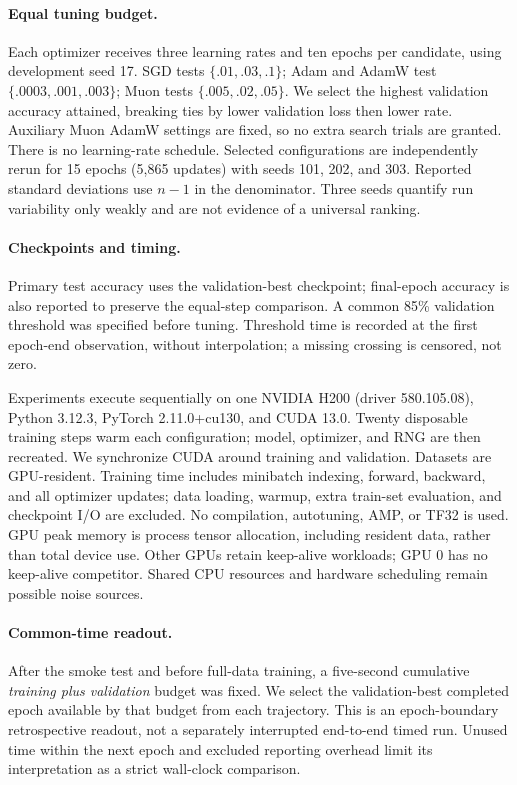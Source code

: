 \documentclass[10pt,a4paper,twocolumn]{article}
\begin{document}
\paragraph{Equal tuning budget.}
Each optimizer receives three learning rates and ten epochs per candidate, using development seed 17. SGD tests $\{.01,.03,.1\}$; Adam and AdamW test $\{.0003,.001,.003\}$; Muon tests $\{.005,.02,.05\}$. We select the highest validation accuracy attained, breaking ties by lower validation loss then lower rate. Auxiliary Muon AdamW settings are fixed, so no extra search trials are granted. There is no learning-rate schedule. Selected configurations are independently rerun for 15 epochs (5,865 updates) with seeds 101, 202, and 303. Reported standard deviations use $n-1$ in the denominator. Three seeds quantify run variability only weakly and are not evidence of a universal ranking.

\paragraph{Checkpoints and timing.}
Primary test accuracy uses the validation-best checkpoint; final-epoch accuracy is also reported to preserve the equal-step comparison. A common 85\% validation threshold was specified before tuning. Threshold time is recorded at the first epoch-end observation, without interpolation; a missing crossing is censored, not zero.

Experiments execute sequentially on one NVIDIA H200 (driver 580.105.08), Python 3.12.3, PyTorch 2.11.0+cu130, and CUDA 13.0. Twenty disposable training steps warm each configuration; model, optimizer, and RNG are then recreated. We synchronize CUDA around training and validation. Datasets are GPU-resident. Training time includes minibatch indexing, forward, backward, and all optimizer updates; data loading, warmup, extra train-set evaluation, and checkpoint I/O are excluded. No compilation, autotuning, AMP, or TF32 is used. GPU peak memory is process tensor allocation, including resident data, rather than total device use. Other GPUs retain keep-alive workloads; GPU 0 has no keep-alive competitor. Shared CPU resources and hardware scheduling remain possible noise sources.

\paragraph{Common-time readout.}
After the smoke test and before full-data training, a five-second cumulative \emph{training plus validation} budget was fixed. We select the validation-best completed epoch available by that budget from each trajectory. This is an epoch-boundary retrospective readout, not a separately interrupted end-to-end timed run. Unused time within the next epoch and excluded reporting overhead limit its interpretation as a strict wall-clock comparison.
\end{document}
